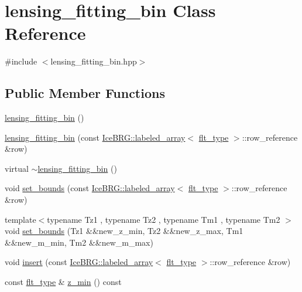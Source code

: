 \hypertarget{classlensing__fitting__bin}{\section{lensing\-\_\-fitting\-\_\-bin Class Reference}
\label{classlensing__fitting__bin}
}


{\ttfamily \#include $<$lensing\-\_\-fitting\-\_\-bin.\-hpp$>$}

\subsection*{Public Member Functions}
\begin{DoxyCompactItemize}
\item 
\hyperlink{classlensing__fitting__bin_a07c2e5fbe3b49afcd5942e5eb77b9b0c}{lensing\-\_\-fitting\-\_\-bin} ()
\item 
\hyperlink{classlensing__fitting__bin_aff68c63086756b4270fe2c5a668e68b1}{lensing\-\_\-fitting\-\_\-bin} (const \hyperlink{classIceBRG_1_1labeled__array}{Ice\-B\-R\-G\-::labeled\-\_\-array}$<$ \hyperlink{lib_2IceBRG__main_2common_8h_ad0f130a56eeb944d9ef2692ee881ecc4}{flt\-\_\-type} $>$\-::row\-\_\-reference \&row)
\item 
virtual \hyperlink{classlensing__fitting__bin_a3ad3ccade2555b458efa76c832fcf948}{$\sim$lensing\-\_\-fitting\-\_\-bin} ()
\item 
void \hyperlink{classlensing__fitting__bin_af10c4cbbf9edc182e604812679828641}{set\-\_\-bounds} (const \hyperlink{classIceBRG_1_1labeled__array}{Ice\-B\-R\-G\-::labeled\-\_\-array}$<$ \hyperlink{lib_2IceBRG__main_2common_8h_ad0f130a56eeb944d9ef2692ee881ecc4}{flt\-\_\-type} $>$\-::row\-\_\-reference \&row)
\item 
{\footnotesize template$<$typename Tz1 , typename Tz2 , typename Tm1 , typename Tm2 $>$ }\\void \hyperlink{classlensing__fitting__bin_a716b1b130506a8aae58b3c0f26b0c166}{set\-\_\-bounds} (Tz1 \&\&new\-\_\-z\-\_\-min, Tz2 \&\&new\-\_\-z\-\_\-max, Tm1 \&\&new\-\_\-m\-\_\-min, Tm2 \&\&new\-\_\-m\-\_\-max)
\item 
void \hyperlink{classlensing__fitting__bin_ac2d8bdb9de64ae102e431e5ad903edaa}{insert} (const \hyperlink{classIceBRG_1_1labeled__array}{Ice\-B\-R\-G\-::labeled\-\_\-array}$<$ \hyperlink{lib_2IceBRG__main_2common_8h_ad0f130a56eeb944d9ef2692ee881ecc4}{flt\-\_\-type} $>$\-::row\-\_\-reference \&row)
\item 
const \hyperlink{lib_2IceBRG__main_2common_8h_ad0f130a56eeb944d9ef2692ee881ecc4}{flt\-\_\-type} \& \hyperlink{classlensing__fitting__bin_a269de73e0eb9e2633f6c88f091e2c3eb}{z\-\_\-min} () const 

\end{DoxyCompactItemize}
